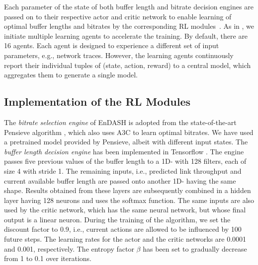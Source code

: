 \indent Each parameter of the state  of both buffer length and bitrate decision engines are passed on to their respective actor and critic network to enable learning of optimal buffer lengths and bitrates by the corresponding \ac{RL} modules~\cite{mao2017neural}.
As in \cite{mao2017neural}, we initiate multiple learning agents to accelerate the training. By default, there are 16 agents. Each agent is designed to experience a different set of input parameters, e.g., network traces. However, the learning agents continuously report  their individual tuples of (state, action, reward)  to a central model, which aggregates them to generate a single model.
\subsection{Implementation of the \acs{RL} Modules}
The \textit{bitrate selection engine} of EnDASH is adopted from the state-of-the-art Pensieve algorithm \cite{mao2017neural}, which also uses \ac{A3C} to learn optimal bitrates. We have used a pretrained model provided by Pensieve, albeit with different input states.  The \textit{buffer length decision engine} has been implemented in Tensorflow \cite{Abadi2016}. The engine passes five previous values of the buffer length to a 1D- with 128 filters, each of size 4 with stride 1. The remaining inputs, i.e., predicted link throughput and current available buffer length are passed onto another 1D- having the same shape. Results obtained from these layers are subsequently combined in a hidden layer having 128 neurons and uses the softmax function. The same inputs are also used by the critic network, which has the same neural network, but whose final output is a linear neuron. During the training of the algorithm, we set the discount factor to 0.9, i.e., current actions are allowed to be influenced by 100 future steps. The learning rates for the actor and the critic networks are 0.0001 and 0.001, respectively. The entropy factor $\beta$ has been set to gradually decrease from 1 to 0.1 over iterations.

